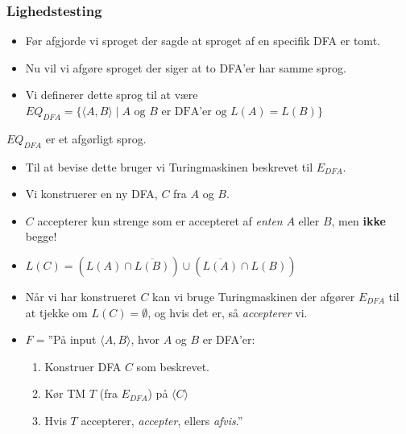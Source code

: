 \begin{frame}[allowframebreaks]
	\frametitle{Lighedstesting}
	\begin{itemize}
		\item Før afgjorde vi sproget der sagde at sproget af en specifik DFA er tomt.
		\item Nu vil vi afgøre sproget der siger at to DFA'er har samme sprog.
		\item Vi definerer dette sprog til at være $EQ_{DFA} = \{\langle A, B \rangle \mid A \text{ og } B \text{ er DFA'er og } L(A) = L(B)\}$
	\end{itemize}

	\begin{theorem}
		$EQ_{DFA}$ er et afgørligt sprog.
	\end{theorem}

	\begin{itemize}
		\item Til at bevise dette bruger vi Turingmaskinen beskrevet til $E_{DFA}$.
		\item Vi konstruerer en ny DFA, $C$ fra $A$ og $B$.
		\item $C$ accepterer kun strenge som er accepteret af \textit{enten} $A$ eller $B$, men \textbf{ikke} begge!
		\item $L(C) = \left( L(A) \cap \overline{L(B)} \right) \cup (\overline{L(A)} \cap L(B))$
		\item Når vi har konstrueret $C$ kan vi bruge Turingmaskinen der afgører $E_{DFA}$ til at tjekke om $L(C) = \emptyset$, og hvis det er, så \textit{accepterer} vi.
		\item $F = $''På input \(\langle A, B \rangle\), hvor $A$ og $B$ er DFA'er:
		      \begin{enumerate}
			      \item Konstruer DFA $C$ som beskrevet.
			      \item Kør TM $T$ (fra $E_{DFA}$) på $\langle C \rangle$
			      \item Hvis $T$ accepterer, \textit{accepter}, ellers \textit{afvis}.''
		      \end{enumerate}
	\end{itemize}
\end{frame}


